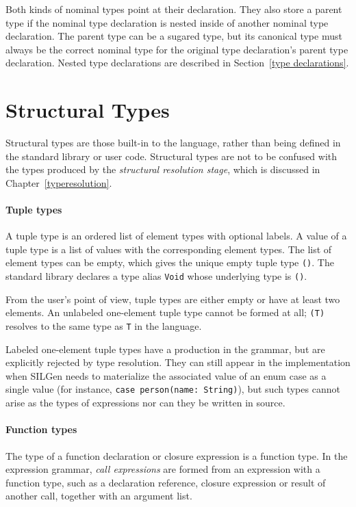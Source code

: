 \documentclass[a4paper,headsepline,bibliography=totoc,toc=flat,fleqn,twoside=semi]{scrbook}
\theoremstyle{definition}
\theoremstyle{definition}
\theoremstyle{definition}
\begin{document}
Both kinds of nominal types point at their declaration. They also store a parent type if the nominal type declaration is nested inside of another nominal type declaration. The parent type can be a sugared type, but its canonical type must always be the correct nominal type for the original type declaration's parent type declaration. Nested type declarations are described in Section~\ref{type declarations}.

\section{Structural Types}

Structural types are those built-in to the language, rather than being defined in the standard library or user code. Structural types are not to be confused with the types produced by the \emph{structural resolution stage}, which is discussed in Chapter~\ref{typeresolution}.

\paragraph{Tuple types}
A tuple type is an ordered list of element types with optional labels. A value of a tuple type is a list of values with the corresponding element types. The list of element types can be empty, which gives the unique empty tuple type \texttt{()}. The standard library declares a type alias \texttt{Void} whose underlying type is \texttt{()}.

From the user's point of view, tuple types are either empty or have at least two elements. An unlabeled one-element tuple type cannot be formed at all; \texttt{(T)} resolves to the same type as \texttt{T} in the language.

Labeled one-element tuple types have a production in the grammar, but are explicitly rejected by type resolution. They can still appear in the implementation when SILGen needs to materialize the associated value of an enum case as a single value (for instance, \texttt{case person(name:\ String)}), but such types cannot arise as the types of expressions nor can they be written in source.

\paragraph{Function types} The type of a function declaration or closure expression is a function type. In the expression grammar, \emph{call expressions} are formed from an expression with a function type, such as a declaration reference, closure expression or result of another call, together with an argument list.
\end{document}
